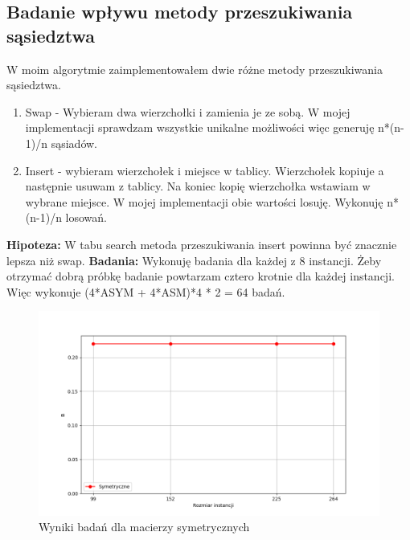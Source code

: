 \documentclass{article}
\begin{document}
      \subsection{Badanie wpływu metody przeszukiwania sąsiedztwa} 
        W moim algorytmie zaimplementowałem dwie różne metody przeszukiwania sąsiedztwa.
        \begin{enumerate}
          \item Swap - Wybieram dwa wierzchołki i zamienia je ze sobą. W mojej implementacji
          sprawdzam wszystkie unikalne możliwości więc generuję n*(n-1)/n sąsiadów.
          \item Insert - wybieram wierzchołek i miejsce w tablicy. Wierzchołek kopiuje a następnie 
          usuwam z tablicy. Na koniec kopię wierzchołka wstawiam w wybrane miejsce. W mojej 
          implementacji obie wartości losuję. Wykonuję n*(n-1)/n losowań.
        \end{enumerate}
        \textbf{Hipoteza: } W tabu search metoda przeszukiwania insert powinna być znacznie lepsza
        niż swap.
        \textbf{Badania: } Wykonuję badania dla każdej z 8 instancji. Żeby otrzymać dobrą próbkę 
        badanie powtarzam cztero krotnie dla każdej instancji. Więc wykonuje (4*ASYM + 4*ASM)*4 * 2 = 64
        badań.
        
        \begin{figure}[ht]
          \centering
          \includegraphics[width=\textwidth]{src/plots/symtest.png}
          \caption{Wyniki badań dla macierzy symetrycznych}
          \label{fig:symNeighg}
        \end{figure}
        \FloatBarrier
\end{document}
